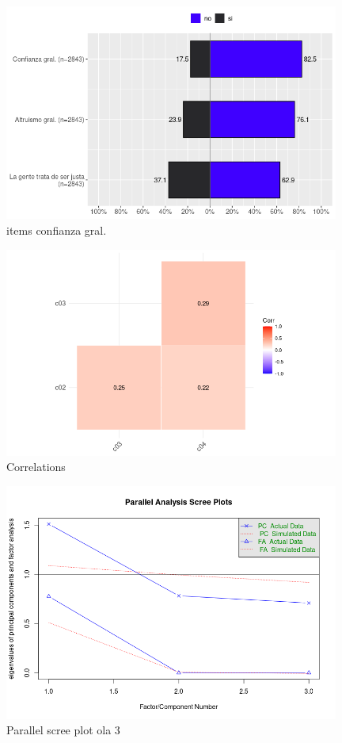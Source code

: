 \begin{figure}[H]
    \centering
    \includegraphics[width=11cm]{output/conf_fact6.png}
    \caption{items confianza gral.}
    \label{fig:conf3}
\end{figure}


\begin{figure}[H]
    \centering
    \includegraphics[width=11cm]{output/corrplot3.png}
    \caption{Correlations}
    \label{fig:corr3}
\end{figure}


\begin{figure}[H]
    \centering
    \includegraphics[width=11cm]{output/scree_plots3.png}
    \caption{Parallel scree plot ola 3}
    \label{fig:scree3}
\end{figure}

